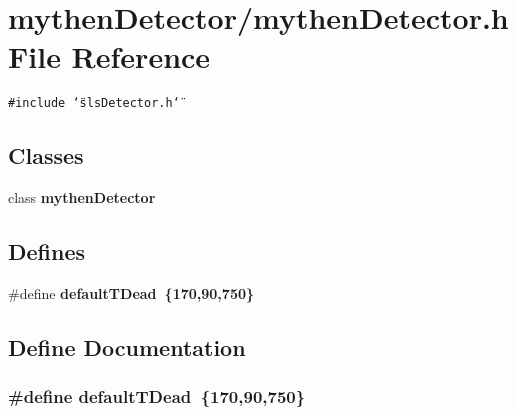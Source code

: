 \section{mythen\-Detector/mythen\-Detector.h File Reference}
\label{mythenDetector_8h}
{\tt \#include \char`\"{}sls\-Detector.h\char`\"{}}\par
\subsection*{Classes}
\begin{CompactItemize}
\item 
class \bf{mythen\-Detector}
\end{CompactItemize}
\subsection*{Defines}
\begin{CompactItemize}
\item 
\#define \bf{default\-TDead}~\{170,90,750\}
\end{CompactItemize}


\subsection{Define Documentation}
\subsubsection{\setlength{\rightskip}{0pt plus 5cm}\#define default\-TDead~\{170,90,750\}}\label{mythenDetector_8h_082faba3de8ce8379e160e3067333d14}


